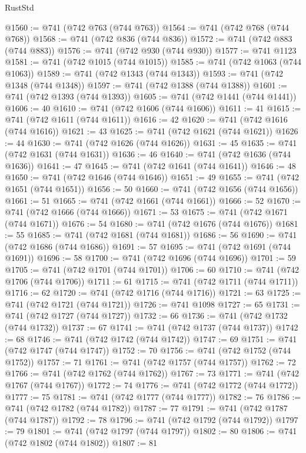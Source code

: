 \begin{lexlean}{RustStd}
\begin{coremodule}
{\begin{coremodule}
{{{{{{{{{{{{{{{{{{{{{{{{{{{{{{{{{{{{{{{{{{{{{@1560 := @741 (@742 @763 (@744 @763))
@1564 := @741 (@742 @768 (@744 @768))
@1568 := @741 (@742 @836 (@744 @836))
@1572 := @741 (@742 @883 (@744 @883))
@1576 := @741 (@742 @930 (@744 @930))
@1577 := @741 @1123
@1581 := @741 (@742 @1015 (@744 @1015))
@1585 := @741 (@742 @1063 (@744 @1063))
@1589 := @741 (@742 @1343 (@744 @1343))
@1593 := @741 (@742 @1348 (@744 @1348))
@1597 := @741 (@742 @1388 (@744 @1388))
@1601 := @741 (@742 @1393 (@744 @1393))
@1605 := @741 (@742 @1441 (@744 @1441))
@1606 := 40
@1610 := @741 (@742 @1606 (@744 @1606))
@1611 := 41
@1615 := @741 (@742 @1611 (@744 @1611))
@1616 := 42
@1620 := @741 (@742 @1616 (@744 @1616))
@1621 := 43
@1625 := @741 (@742 @1621 (@744 @1621))
@1626 := 44
@1630 := @741 (@742 @1626 (@744 @1626))
@1631 := 45
@1635 := @741 (@742 @1631 (@744 @1631))
@1636 := 46
@1640 := @741 (@742 @1636 (@744 @1636))
@1641 := 47
@1645 := @741 (@742 @1641 (@744 @1641))
@1646 := 48
@1650 := @741 (@742 @1646 (@744 @1646))
@1651 := 49
@1655 := @741 (@742 @1651 (@744 @1651))
@1656 := 50
@1660 := @741 (@742 @1656 (@744 @1656))
@1661 := 51
@1665 := @741 (@742 @1661 (@744 @1661))
@1666 := 52
@1670 := @741 (@742 @1666 (@744 @1666))
@1671 := 53
@1675 := @741 (@742 @1671 (@744 @1671))
@1676 := 54
@1680 := @741 (@742 @1676 (@744 @1676))
@1681 := 55
@1685 := @741 (@742 @1681 (@744 @1681))
@1686 := 56
@1690 := @741 (@742 @1686 (@744 @1686))
@1691 := 57
@1695 := @741 (@742 @1691 (@744 @1691))
@1696 := 58
@1700 := @741 (@742 @1696 (@744 @1696))
@1701 := 59
@1705 := @741 (@742 @1701 (@744 @1701))
@1706 := 60
@1710 := @741 (@742 @1706 (@744 @1706))
@1711 := 61
@1715 := @741 (@742 @1711 (@744 @1711))
@1716 := 62
@1720 := @741 (@742 @1716 (@744 @1716))
@1721 := 63
@1725 := @741 (@742 @1721 (@744 @1721))
@1726 := @741 @1098
@1727 := 65
@1731 := @741 (@742 @1727 (@744 @1727))
@1732 := 66
@1736 := @741 (@742 @1732 (@744 @1732))
@1737 := 67
@1741 := @741 (@742 @1737 (@744 @1737))
@1742 := 68
@1746 := @741 (@742 @1742 (@744 @1742))
@1747 := 69
@1751 := @741 (@742 @1747 (@744 @1747))
@1752 := 70
@1756 := @741 (@742 @1752 (@744 @1752))
@1757 := 71
@1761 := @741 (@742 @1757 (@744 @1757))
@1762 := 72
@1766 := @741 (@742 @1762 (@744 @1762))
@1767 := 73
@1771 := @741 (@742 @1767 (@744 @1767))
@1772 := 74
@1776 := @741 (@742 @1772 (@744 @1772))
@1777 := 75
@1781 := @741 (@742 @1777 (@744 @1777))
@1782 := 76
@1786 := @741 (@742 @1782 (@744 @1782))
@1787 := 77
@1791 := @741 (@742 @1787 (@744 @1787))
@1792 := 78
@1796 := @741 (@742 @1792 (@744 @1792))
@1797 := 79
@1801 := @741 (@742 @1797 (@744 @1797))
@1802 := 80
@1806 := @741 (@742 @1802 (@744 @1802))
@1807 := 81
}}}}}}}}}}}}}}}}}}}}}}}}}}}}}}}}}}}}}}}}}}}}}
\end{coremodule}}
\end{coremodule}
\end{lexlean}

